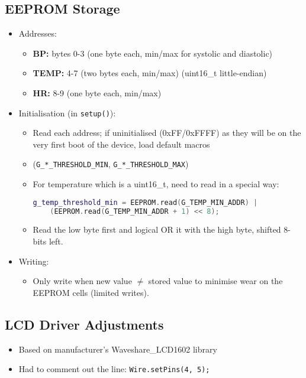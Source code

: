 \subsection{EEPROM Storage}
\begin{itemize}
	\item Addresses:
	\begin{itemize}
		\item \textbf{BP:} bytes 0-3 (one byte each, min/max for systolic and diastolic)
		\item \textbf{TEMP:} 4-7 (two bytes each, min/max) (uint16\_t little-endian)
		\item \textbf{HR:} 8-9 (one byte each, min/max)
	\end{itemize}
	\item Initialisation (in \lstinline|setup()|):
	\begin{itemize}
		\item Read each address; if uninitialised (0xFF/0xFFFF) as they will be on the very first boot of the device, load default macros
		\item[] (\lstinline|G_*_THRESHOLD_MIN|, \lstinline|G_*_THRESHOLD_MAX|)
		\item[] For temperature which is a uint16\_t, need to read in a special way:
\begin{lstlisting}[language=C++]
g_temp_threshold_min = EEPROM.read(G_TEMP_MIN_ADDR) |
	(EEPROM.read(G_TEMP_MIN_ADDR + 1) << 8);
\end{lstlisting}
		\item[] Read the low byte first and logical OR it with the high byte, shifted 8-bits left.
	\end{itemize}
	\item Writing:
	\begin{itemize}
		\item Only write when new value $\neq$ stored value to minimise wear on the EEPROM cells (limited writes).
	\end{itemize}
\end{itemize}

\subsection{LCD Driver Adjustments}
\begin{itemize}
	\item Based on manufacturer's Waveshare\_LCD1602 library
	\item Had to comment out the line: \lstinline|Wire.setPins(4, 5);|
\end{itemize}
